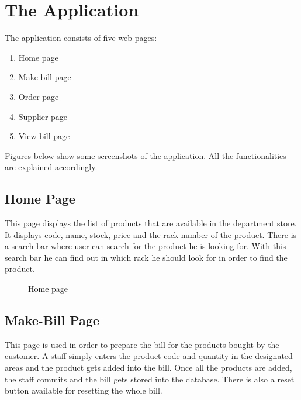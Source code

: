 \section{The Application}

The application consists of five web pages:
\begin{enumerate}[noitemsep,topsep=0pt]
  \item Home page
  \item Make bill page
  \item Order page
  \item Supplier page
  \item View-bill page
\end{enumerate}

Figures below show some screenshots of the application. All the
functionalities are explained accordingly.

\subsection{Home Page}

This page displays the list of products that are available
in the department store. It displays code, name, stock, price and the rack
number of the product. There is a search bar where user can search for the
product he is looking for. With this search bar he can find out in which rack
he should look for in order to find the product.

\begin{figure}[h!]\centering
  \caption{Home page}\label{fig:home}
\end{figure}

\subsection{Make-Bill Page}

This page is used in order to prepare the bill for the products
bought by the customer. A staff simply enters the product code and quantity in
the designated areas and the product gets added into the bill. Once all the
products are added, the staff commits and the bill gets stored into the
database. There is also a reset button available for resetting the whole bill.

